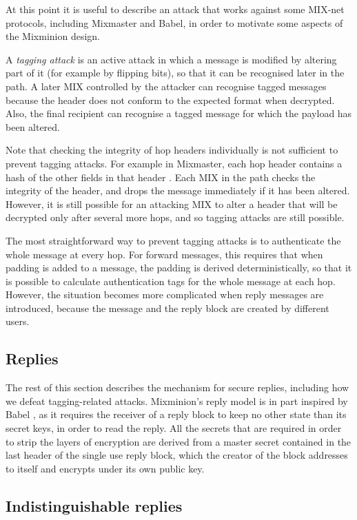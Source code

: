 \documentclass{llncs}
\begin{document}
At this point it is useful to describe an attack that works against some
MIX-net protocols, including Mixmaster and Babel, in order to motivate
some aspects of the Mixminion design.

A {\em tagging attack} is an active attack in which a message is
modified by altering part of it (for example by flipping bits), so
that it can be recognised later in the path.  A later MIX controlled by
the attacker can recognise tagged messages because the header does
not conform to the expected format when decrypted.  Also, the final
recipient can recognise a tagged message for which the payload has
been altered.

Note that checking the integrity of hop headers individually is not
sufficient to prevent tagging attacks.  For example in Mixmaster,
each hop header contains a hash of the other fields in that header
\cite{mixmaster-spec}.
Each MIX in the path checks the integrity of the header, and drops
the message immediately if it has been altered.  However, it is still
possible for an attacking MIX to alter a header that will be decrypted
only after several more hops, and so tagging attacks are still possible.

The most straightforward way to prevent tagging attacks is to
authenticate the whole message at every hop.  For forward messages,
this requires that when padding is added to a message, the padding is
derived deterministically, so that it is possible to calculate
authentication tags for the whole message at each hop.  However,
the situation becomes more complicated when reply messages are
introduced, because the message and the reply block are
created by different users.

\subsection{Replies}
\label{subsec:replies}

The rest of this section describes the mechanism for secure replies,
including how we defeat tagging-related attacks. Mixminion's reply
model is in part inspired by Babel \cite{babel}, as it requires the
receiver of a reply block to keep no other state than its secret keys,
in order to read the reply.  All the secrets that are required in
order to strip the layers of encryption are derived from a master
secret contained in the last header of the single use reply block, which
the creator of the block addresses to itself and encrypts under its
own public key.

\subsection{Indistinguishable replies}
\label{subsec:header-swap}
\end{document}
